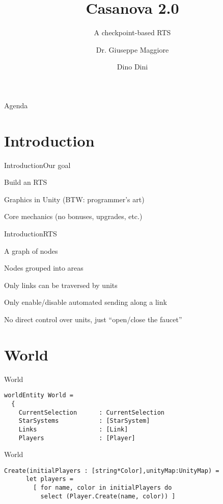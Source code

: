 \documentclass{beamer}
\title{Casanova 2.0}
\subtitle{A checkpoint-based RTS}
\author{Dr. Giuseppe Maggiore \and Dino Dini}
\institute{NHTV University of Applied Sciences \\ 
Breda, Netherlands}
\date{}
\begin{document}
\maketitle

\begin{frame}{Agenda}
\tableofcontents
\end{frame}

\section{Introduction}
\begin{slide}{Introduction}{Our goal}{
\item Build an RTS
\item Graphics in Unity (BTW: programmer's art)
\item Core mechanics (no bonuses, upgrades, etc.)
}\end{slide}

\begin{slide}{Introduction}{RTS}{
\item A graph of nodes
\item Nodes grouped into areas
\item Only links can be traversed by units
\item Only enable/disable automated sending along a link
\item No direct control over units, just ``open/close the faucet''
}\end{slide}


\section{World}
\begin{frame}[fragile]{World}
\begin{lstlisting}[frame=shadowbox]
worldEntity World =
  {
    CurrentSelection      : CurrentSelection
    StarSystems           : [StarSystem]
    Links                 : [Link]
    Players               : [Player]
\end{lstlisting}
\end{frame}

\begin{frame}[fragile]{World}
\begin{lstlisting}[frame=shadowbox]
    Create(initialPlayers : [string*Color],unityMap:UnityMap) =
      let players =
        [ for name, color in initialPlayers do
          select (Player.Create(name, color)) ]
\end{lstlisting}
\end{frame}
\end{document}
